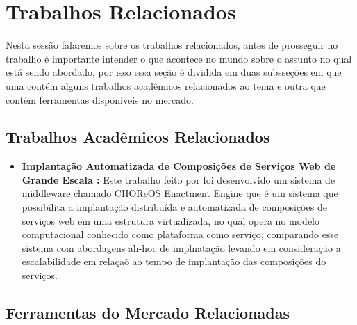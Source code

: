 
\section{Trabalhos Relacionados}

Nesta sessão falaremos sobre os trabalhos relacionados, antes de prosseguir no
trabalho é importante intender o que acontece no mundo sobre o assunto no qual
está sendo abordado, por isso essa seção é dividida em duas subsseções em que uma
contém alguns trabalhos acadêmicos relacionados ao tema e outra que contém
ferramentas disponíveis no mercado.

\subsection{Trabalhos Acadêmicos Relacionados}

\begin{itemize}
  \item  \textbf{Implantação Automatizada de Composições de Serviços Web de Grande Escala :}
  Este trabalho feito por \cite{leo2014} foi desenvolvido um sistema de middleware
  chamado CHOReOS Enactment Engine que é um sistema que possibilita a implantação
  distribuída e automatizada de composições de serviços web em uma estrutura virtualizada,
  no qual opera no modelo computacional conhecido como plataforma como serviço,
  comparando esse sistema com abordagens ah-hoc de implnatação levando em consideração
  a escalabilidade em relaçaõ ao tempo de implantação das composições do serviços.
\end{itemize}

\subsection{Ferramentas do Mercado Relacionadas}


